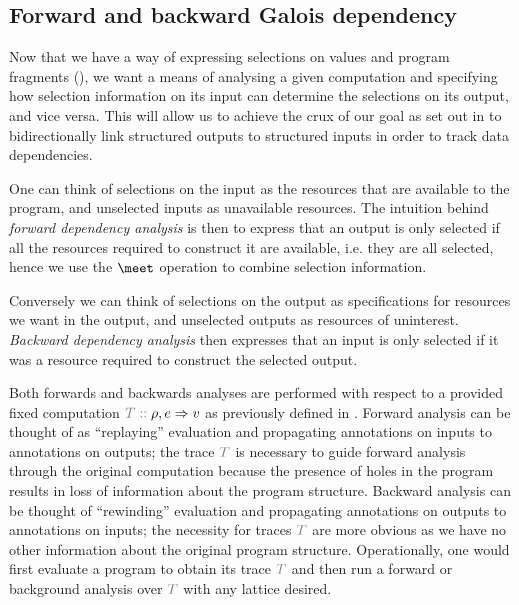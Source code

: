 \subsection{Forward and backward Galois dependency}
\label{sec:core-language:fwd-bwd}

Now that we have a way of expressing selections on values and program fragments (), we want a means of analysing a given computation and specifying how selection information on its input can determine the selections on its output, and vice versa. This will allow us to achieve the crux of our goal as set out in  to bidirectionally link structured outputs to structured inputs in order to track data dependencies.

One can think of selections on the input as the resources that are available to the program, and unselected inputs as unavailable resources. The intuition behind \textit{forward dependency analysis} is then to express that an output is only selected if all the resources required to construct it are available, i.e. they are all selected, hence we use the $\meet$ operation to combine selection information.

Conversely we can think of selections on the output as specifications for resources we want in the output, and unselected outputs as resources of uninterest. \textit{Backward dependency analysis} then expresses that an input is only selected if it was a resource required to construct the selected output.

Both forwards and backwards analyses are performed with respect to a provided fixed computation $\explVal{T}{\rho, e \evalR v}$ as previously defined in . Forward analysis can be thought of as ``replaying'' evaluation and propagating annotations on inputs to annotations on outputs; the trace $\textcolor{gray}{T}$ is necessary to guide forward analysis through the original computation because the presence of holes in the program results in loss of information about the program structure. Backward analysis can be thought of ``rewinding'' evaluation and propagating annotations on outputs to annotations on inputs; the necessity for traces $\textcolor{gray}{T}$ are more obvious as we have no other information about the original program structure. Operationally, one would first evaluate a program to obtain its trace $\textcolor{gray}{T}$ and then run a forward or background analysis over $\textcolor{gray}{T}$ with any lattice desired.

